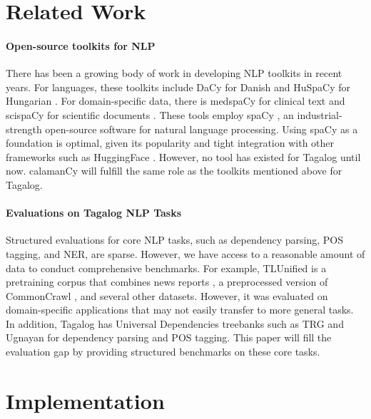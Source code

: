 \documentclass[11pt]{article}
\begin{document}



\section{Related Work}

\paragraph*{Open-source toolkits for NLP}
There has been a growing body of work in developing NLP toolkits in recent years. 
For languages, these toolkits include DaCy for Danish \citep{Enevoldsen2021DaCyAU} and HuSpaCy for Hungarian \citep{Orosz2022HuSpaCyAI}.
For domain-specific data, there is medspaCy for clinical text \citep{Eyre2021LaunchingIC} and scispaCy for scientific documents \citep{Neumann2019ScispaCyFA}.
These tools employ spaCy \citep{Honnibal2020Spacy}, an industrial-strength open-source software for natural language processing.
Using spaCy as a foundation is optimal, given its popularity and tight integration with other frameworks such as HuggingFace \citep{Wolf2019HuggingFacesTS}.
However, no tool has existed for Tagalog until now.
calamanCy will fulfill the same role as the toolkits mentioned above for Tagalog.

\paragraph*{Evaluations on Tagalog NLP Tasks} 
Structured evaluations for core NLP tasks, such as dependency parsing, POS tagging, and NER, are sparse.
However, we have access to a reasonable amount of data to conduct comprehensive benchmarks.
For example, TLUnified \citep{Cruz2021ImprovingLL} is a pretraining corpus that combines news reports \citep{Cruz2020ExploitingNA}, a preprocessed version of CommonCrawl \citep{OrtizSuarez2019AsynchronousPF}, and several other datasets.
However, it was evaluated on domain-specific applications that may not easily transfer to more general tasks.
In addition, Tagalog has Universal Dependencies treebanks such as TRG \citep{Samson2018TRG} and Ugnayan \citep{Aquino2020ParsingIT} for dependency parsing and POS tagging.
This paper will fill the evaluation gap by providing structured benchmarks on these core tasks.

\section{Implementation}
\end{document}
